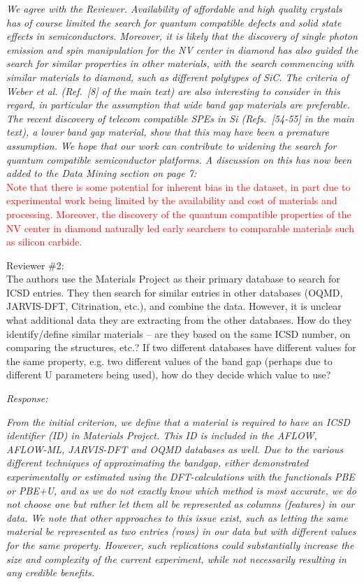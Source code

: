 \documentclass[11pt, a4paper]{letter} %
\newcommand{\mrk}[1]{\textcolor{red}{#1}}
\begin{document}
\textit{We agree with the Reviewer. Availability of affordable and high quality crystals has of course limited the search for quantum compatible defects and solid state effects in semiconductors. Moreover, it is likely that the discovery of single photon emission and spin manipulation for the NV center in diamond has also guided the search for similar properties in other materials, with the search commencing with similar materials to diamond, such as different polytypes of SiC. The criteria of Weber et al. (Ref.~[8] of the main text) are also interesting to consider in this regard, in particular the assumption that wide band gap materials are preferable. The recent discovery of telecom compatible SPEs in Si (Refs.~[54-55] in the main text), a lower band gap material, show that this may have been a premature assumption. We hope that our work can contribute to widening the search for quantum compatible semiconductor platforms. 
A discussion on this has now been added to the Data Mining section on page 7: } \\ 
\mrk{Note that there is some potential for inherent bias in the dataset, in part due to experimental work being limited by the availability and cost of materials and processing. Moreover, the discovery of the quantum compatible properties of the NV center in diamond naturally led early searchers to comparable materials such as silicon carbide. }

Reviewer \#2: \\
The authors use the Materials Project as their primary database to search for ICSD entries. They then search for similar entries in other databases (OQMD, JARVIS-DFT, Citrination, etc.), and combine the data. However, it is unclear what additional data they are extracting from the other databases. How do they identify/define similar materials – are they based on the same ICSD number, on comparing the structures, etc.? If two different databases have different values for the same property, e.g. two different values of the band gap (perhaps due to different U parameters being used), how do they decide which value to use?

\textit{Response:}

\textit{From the initial criterion, we define that a material is required to have an ICSD identifier (ID) in Materials Project. This ID is included in the AFLOW, AFLOW-ML, JARVIS-DFT and OQMD databases as well. Due to the various different techniques of approximating the bandgap, either demonstrated experimentally or estimated using the DFT-calculations with the functionals PBE or PBE+U, and as we do not exactly know which method is most accurate, we do not choose one but rather let them all be represented as columns (features) in our data. 
We note that other approaches to this issue  exist, such as letting the same material be represented as two entries (rows) in our data but with different values for the same property. However, such replications could substantially increase the size and complexity of the current experiment, while not necessarily resulting in any credible benefits.} 
\end{document}
